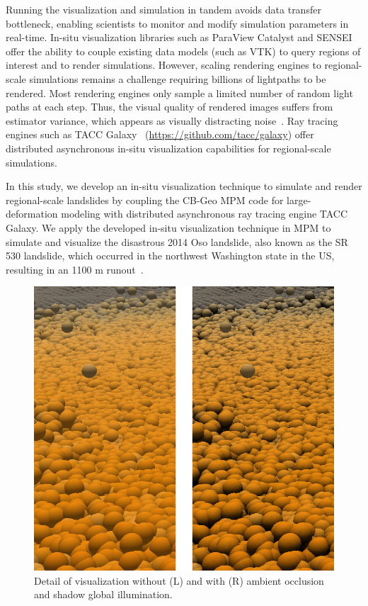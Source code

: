 \documentclass[journal]{IEEEtran}
\begin{document}
Running the visualization and simulation in tandem avoids data transfer bottleneck, enabling scientists to monitor and modify simulation parameters in real-time. In-situ visualization libraries such as ParaView Catalyst and SENSEI offer the ability to couple existing data models (such as VTK) to query regions of interest and to render simulations. However, scaling rendering engines to regional-scale simulations remains a challenge requiring billions of lightpaths to be rendered. Most rendering engines only sample a limited number of random light paths at each step. Thus, the visual quality of rendered images suffers from estimator variance, which appears as visually distracting noise~\cite{yang2021foveated}. Ray tracing engines such as TACC Galaxy~\cite{abram2018galaxy} (\url{https://github.com/tacc/galaxy}) offer distributed asynchronous in-situ visualization capabilities for regional-scale simulations. 

In this study, we develop an in-situ visualization technique to simulate and render regional-scale landslides by coupling the CB-Geo MPM code for large-deformation modeling with distributed asynchronous ray tracing engine TACC Galaxy. We apply the developed in-situ visualization technique in MPM to simulate and visualize the disastrous 2014 Oso landslide, also known as the SR 530 landslide, which occurred in the northwest Washington state in the US,  resulting in an 1100 m runout~\cite{yerro2019runout}. 

\begin{figure}[!htbp]
    \centering
    \includegraphics[width=\linewidth]{figs/sideBySide-Global-Illum.png}
    \caption{Detail of visualization without (L) and with (R) ambient occlusion and shadow global illumination.} 
    \label{fig:global_illum}
\end{figure}
\end{document}

